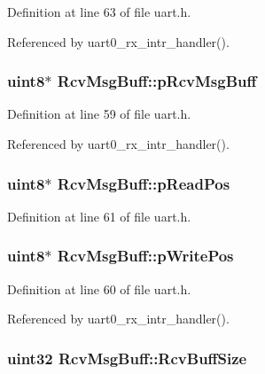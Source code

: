 Definition at line 63 of file uart.\-h.



Referenced by uart0\-\_\-rx\-\_\-intr\-\_\-handler().

\hypertarget{structRcvMsgBuff_a62921396b7988d167cdbfadaeaafa1ad}{
\subsubsection[{p\-Rcv\-Msg\-Buff}]{\setlength{\rightskip}{0pt plus 5cm}uint8$\ast$ Rcv\-Msg\-Buff\-::p\-Rcv\-Msg\-Buff}}\label{structRcvMsgBuff_a62921396b7988d167cdbfadaeaafa1ad}


Definition at line 59 of file uart.\-h.



Referenced by uart0\-\_\-rx\-\_\-intr\-\_\-handler().

\hypertarget{structRcvMsgBuff_aee50309a2497fffef33577ab901fe2cc}{
\subsubsection[{p\-Read\-Pos}]{\setlength{\rightskip}{0pt plus 5cm}uint8$\ast$ Rcv\-Msg\-Buff\-::p\-Read\-Pos}}\label{structRcvMsgBuff_aee50309a2497fffef33577ab901fe2cc}


Definition at line 61 of file uart.\-h.

\hypertarget{structRcvMsgBuff_adcdca9d20078d517946d66d355579693}{
\subsubsection[{p\-Write\-Pos}]{\setlength{\rightskip}{0pt plus 5cm}uint8$\ast$ Rcv\-Msg\-Buff\-::p\-Write\-Pos}}\label{structRcvMsgBuff_adcdca9d20078d517946d66d355579693}


Definition at line 60 of file uart.\-h.



Referenced by uart0\-\_\-rx\-\_\-intr\-\_\-handler().

\hypertarget{structRcvMsgBuff_a100e2cdf15349ae18fca2fbb67d5845b}{
\subsubsection[{Rcv\-Buff\-Size}]{\setlength{\rightskip}{0pt plus 5cm}uint32 Rcv\-Msg\-Buff\-::\-Rcv\-Buff\-Size}}\label{structRcvMsgBuff_a100e2cdf15349ae18fca2fbb67d5845b}


